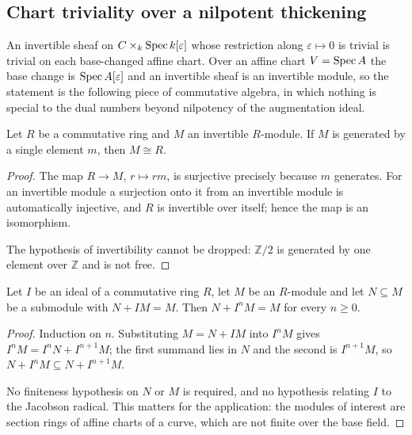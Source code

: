 \subsection{Chart triviality over a nilpotent thickening}

An invertible sheaf on \(C \times_k \operatorname{Spec} k[\varepsilon]\) whose restriction
along \(\varepsilon \mapsto 0\) is trivial is trivial on each base-changed
affine chart. Over an affine chart \(V = \operatorname{Spec} A\) the base change is
\(\operatorname{Spec} A[\varepsilon]\) and an invertible sheaf is an invertible module, so
the statement is the following piece of commutative algebra, in which nothing
is special to the dual numbers beyond nilpotency of the augmentation ideal.

\begin{lemma}\leanok
  \label{lem:invertible_cyclic_free}
  Let \(R\) be a commutative ring and \(M\) an invertible \(R\)-module. If
  \(M\) is generated by a single element \(m\), then \(M \cong R\).
\end{lemma}

\begin{proof}\leanok
  The map \(R \to M\), \(r \mapsto rm\), is surjective precisely because \(m\)
  generates. For an invertible module a surjection onto it from an invertible
  module is automatically injective, and \(R\) is invertible over itself;
  hence the map is an isomorphism.

  The hypothesis of invertibility cannot be dropped: \(\mathbb{Z}/2\) is
  generated by one element over \(\mathbb{Z}\) and is not free.
\end{proof}

\begin{lemma}\leanok
  \label{lem:nilpotent_nakayama}
  Let \(I\) be an ideal of a commutative ring \(R\), let \(M\) be an
  \(R\)-module and let \(N \subseteq M\) be a submodule with
  \(N + IM = M\). Then \(N + I^{n}M = M\) for every \(n \ge 0\).
\end{lemma}

\begin{proof}\leanok
  Induction on \(n\). Substituting \(M = N + IM\) into \(I^{n}M\) gives
  \(I^{n}M = I^{n}N + I^{n+1}M\); the first summand lies in \(N\) and the
  second is \(I^{n+1}M\), so \(N + I^{n}M \subseteq N + I^{n+1}M\).

  No finiteness hypothesis on \(N\) or \(M\) is required, and no hypothesis
  relating \(I\) to the Jacobson radical. This matters for the application:
  the modules of interest are section rings of affine charts of a curve, which
  are not finite over the base field.
\end{proof}

